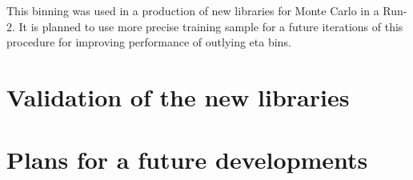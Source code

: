 This binning was used in a production of new libraries for Monte Carlo in a Run-2. It is planned to use more precise training sample for a future iterations of this procedure for improving performance of outlying eta bins.

\section{Validation of the new libraries}\label{sec:FSValidation}
\section{Plans for a future developments}